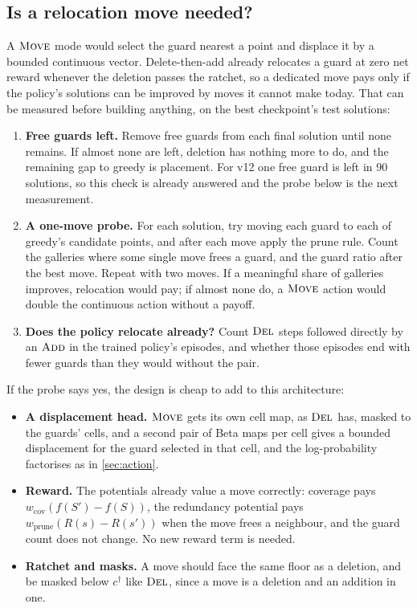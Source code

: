 \documentclass[11pt,a4paper]{article}
\begin{document}
\subsection{Is a relocation move needed?}

A $\textsc{Move}$ mode would select the guard nearest a point and displace it by a bounded
continuous vector. Delete-then-add already relocates a guard at zero net reward whenever the
deletion passes the ratchet, so a dedicated move pays only if the policy's solutions can be
improved by moves it cannot make today. That can be measured before building anything, on
the best checkpoint's test solutions:
\begin{enumerate}
  \item \textbf{Free guards left.} Remove free guards from each final solution until none
        remains. If almost none are left, deletion has nothing more to do, and the remaining
        gap to greedy is placement. For v12 one free guard is left in 90 solutions, so this check is
        already answered and the probe below is the next measurement.
  \item \textbf{A one-move probe.} For each solution, try moving each guard to each of greedy's
        candidate points, and after each move apply the prune rule. Count the galleries where
        some single move frees a guard, and the guard ratio after the best move. Repeat with
        two moves. If a meaningful share of galleries improves, relocation would pay; if
        almost none do, a $\textsc{Move}$ action would double the continuous action without a payoff.
  \item \textbf{Does the policy relocate already?} Count $\textsc{Del}$ steps followed directly by an
        $\textsc{Add}$ in the trained policy's episodes, and whether those episodes end with fewer
        guards than they would without the pair.
\end{enumerate}

If the probe says yes, the design is cheap to add to this architecture:
\begin{itemize}
  \item \textbf{A displacement head.} $\textsc{Move}$ gets its own cell map, as $\textsc{Del}$ has, masked
        to the guards' cells, and a second pair of Beta maps per cell gives a bounded
        displacement for the guard selected in that cell, and the log-probability factorises
        as in \cref{sec:action}.
  \item \textbf{Reward.} The potentials already value a move correctly: coverage pays
        $w_{\mathrm{cov}}(f(S') - f(S))$, the redundancy potential pays
        $w_{\mathrm{prune}}(R(s)-R(s'))$ when the move frees a neighbour, and the guard count
        does not change. No new reward term is needed.
  \item \textbf{Ratchet and masks.} A move should face the same floor as a deletion, and be
        masked below $c^\dagger$ like $\textsc{Del}$, since a move is a deletion and an addition in one.
\end{itemize}
\end{document}
